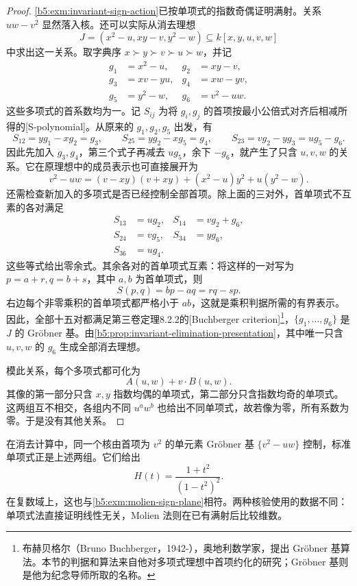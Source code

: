 \begin{proof}
	\cref{b5:exm:invariant-sign-action}已按单项式的指数奇偶证明满射。关系 \(uw-v^2\) 显然落入核。还可以实际从消去理想
	\[
		J=(x^2-u,xy-v,y^2-w)\subseteq k[x,y,u,v,w]
	\]
	中求出这一关系。取字典序 \(x\succ y\succ v\succ u\succ w\)，并记
	\[
		\begin{aligned}
			g_1&=x^2-u,&g_2&=xy-v,\\
			g_3&=xv-yu,&g_4&=xw-yv,\\
			g_5&=y^2-w,&g_6&=v^2-uw.
		\end{aligned}
	\]
	这些多项式的首系数均为一。记 \(S_{ij}\) 为将 \(g_i,g_j\) 的首项按最小公倍式对齐后相减所得的[S-polynomial]。从原来的 \(g_1,g_2,g_5\) 出发，有
	\[
		S_{12}=yg_1-xg_2=g_3,\qquad S_{25}=yg_2-xg_5=g_4,\qquad S_{23}=vg_2-yg_3=ug_5-g_6.
	\]
	因此先加入 \(g_3,g_4\)，第三个式子再减去 \(ug_5\)，余下 \(-g_6\)，就产生了只含 \(u,v,w\) 的关系。它在原理想中的成员表示也可直接展开为
	\[
		v^2-uw=(v-xy)(v+xy)+(x^2-u)y^2+u(y^2-w).
	\]
	还需检查新加入的多项式是否已经控制全部首项。除上面的三对外，首单项式不互素的各对满足
	\[
		\begin{aligned}
			S_{13}&=ug_2,&S_{14}&=vg_2+g_6,\\
			S_{24}&=vg_5,&S_{34}&=yg_6,\\
			S_{36}&=ug_4.
		\end{aligned}
	\]
	这些等式给出零余式。其余各对的首单项式互素：将这样的一对写为 \(p=a+r,q=b+s\)，其中 \(a,b\) 为首单项式，则
	\[
		S(p,q)=bp-aq=rq-sp.
	\]
	右边每个非零乘积的首单项式都严格小于 \(ab\)，这就是乘积判据所需的有界表示。因此，全部十五对都满足第三卷定理8.2.2的[Buchberger criterion]\footnote{布赫贝格尔（Bruno Buchberger，1942-），奥地利数学家，提出 Gröbner 基算法。本节的判据和算法来自他对多项式理想中首项约化的研究；Gröbner 基则是他为纪念导师所取的名称。}，\(\{g_1,\ldots,g_6\}\) 是 \(J\) 的 Gröbner 基。由\cref{b5:prop:invariant-elimination-presentation}，其中唯一只含 \(u,v,w\) 的 \(g_6\) 生成全部消去理想。

	模此关系，每个多项式都可化为
	\[
		A(u,w)+v\cdot B(u,w).
	\]
	其像的第一部分只含 \(x,y\) 指数均偶的单项式，第二部分只含指数均奇的单项式。这两组互不相交，各组内不同 \(u^aw^b\) 也给出不同单项式，故若像为零，所有系数为零。于是没有其他关系。
\end{proof}

在消去计算中，同一个核由首项为 \(v^2\) 的单元素 Gröbner 基 \(\{v^2-uw\}\) 控制，标准单项式正是上述两组。它们给出
\[
	H(t)=\frac{1+t^2}{(1-t^2)^2}.
\]
在复数域上，这也与\cref{b5:exm:molien-sign-plane}相符。两种核验使用的数据不同：单项式法直接证明线性无关，Molien 法则在已有满射后比较维数。

